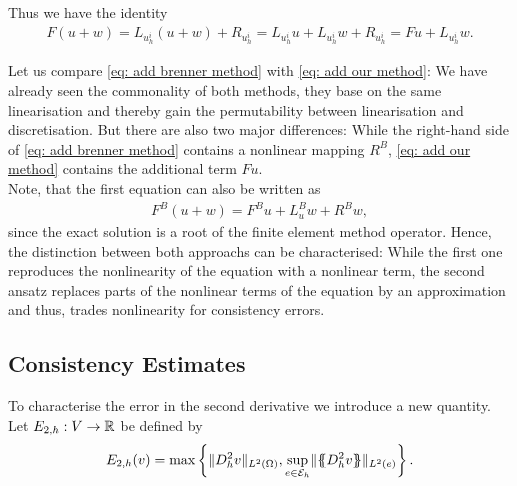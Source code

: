 Thus we have the identity 
\begin{align}
	F(u+w) = L_{u^i_h} (u+w) + R_{u^i_h} = L_{u^i_h} u +L_{u^i_h}w + R_{u^i_h} = Fu + L_{u^i_h}w. \label{eq: add our method}
\end{align}

Let us compare \eqref{eq: add brenner method} with \eqref{eq: add our method}: We have already seen the commonality of both methods, they base on the same linearisation and thereby gain the permutability between linearisation and discretisation. 
But there are also two major differences: While the right-hand side of \eqref{eq: add brenner method} contains a nonlinear mapping $R^B$, \eqref{eq: add our method} contains the additional term $Fu$. \\
Note, that the first equation can also be written as 
 \begin{align*}
 F^B(u +w ) = F^B u + L^B_u w + R^Bw,
 \end{align*}
since the exact \MA solution is a root of the finite element method operator. 
Hence, the distinction between both approachs can be characterised: While the first one reproduces the nonlinearity of the \MA equation with a nonlinear term, the second ansatz replaces parts of the nonlinear terms of the equation by an approximation and thus, trades nonlinearity for consistency errors.

\subsection{Consistency Estimates}

To characterise the error in the second derivative we introduce a new quantity. Let $E_{2,h}:V \rightarrow \mathbb{R}$ be defined by
\[
	E_{2,h}(v) = \operatorname{max} \left\{  \lVert D_h^2 v \rVert_{L^2(\Omega)},  \sup_{e \in \mathcal{E}_h} \lVert \{\!\!\{ D_h^2 v \}\!\!\} \rVert_{L^2(e)} \right\} .
\]	

